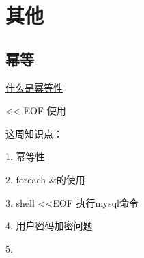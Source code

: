 \chapter{其他}

\section{幂等}



\href{https://blog.csdn.net/miachen520/article/details/91039661}{什么是幂等性}


<< EOF 使用


这周知识点：

1. 幂等性

2. foreach &的使用

3. shell <<EOF 执行mysql命令

4. 用户密码加密问题

5. 
